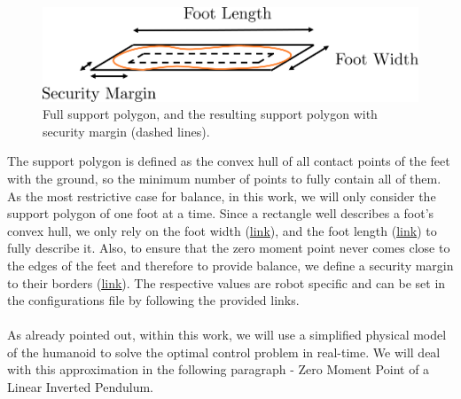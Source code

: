 \begin{figure}[h!]
	\centering
	\includegraphics[scale=.5]{chapters/02_background/img/support_polygon.png}
	\caption{Full support polygon, and the resulting support polygon with security margin (dashed lines).}
	\label{fig::211_support_polygon}
\end{figure}
The support polygon is defined as the convex hull of all contact points of the feet with the ground, so the minimum number of points to fully contain all of them. As the most restrictive case for balance, in this work, we will only consider the support polygon of one foot at a time. Since a rectangle well describes a foot's convex hull, we only rely on the foot width (\href{https://github.com/mhubii/nmpc_pattern_generator/blob/bc79a6d4f9bcfd3794146355af44429f5b7a9fe0/libs/pattern_generator/configs.yaml#L14}{\underline{link}}), and the foot length (\href{https://github.com/mhubii/nmpc_pattern_generator/blob/bc79a6d4f9bcfd3794146355af44429f5b7a9fe0/libs/pattern_generator/configs.yaml#L15}{\underline{link}}) to fully describe it. Also, to ensure that the zero moment point never comes close to the edges of the feet and therefore to provide balance, we define a security margin to their borders (\href{https://github.com/mhubii/nmpc_pattern_generator/blob/bc79a6d4f9bcfd3794146355af44429f5b7a9fe0/libs/pattern_generator/configs.yaml#L3}{\underline{link}}). The respective values are robot specific and can be set in the configurations file by following the provided links.
\\\\
As already pointed out, within this work, we will use a simplified physical model of the humanoid to solve the optimal control problem in real-time. We will deal with this approximation in the following paragraph - Zero Moment Point of a Linear Inverted Pendulum.
\FloatBarrier
